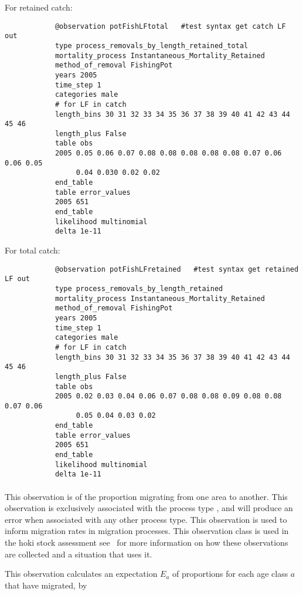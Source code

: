 \begin{itemize}
	For retained catch:
	
	{\small{\begin{verbatim}
			@observation potFishLFtotal   #test syntax get catch LF out
			type process_removals_by_length_retained_total
			mortality_process Instantaneous_Mortality_Retained
			method_of_removal FishingPot
			years 2005
			time_step 1
			categories male
			# for LF in catch
			length_bins 30 31 32 33 34 35 36 37 38 39 40 41 42 43 44 45 46 
			length_plus False
			table obs
			2005 0.05 0.06 0.07 0.08 0.08 0.08 0.08 0.08 0.07 0.06 0.06 0.05 
			     0.04 0.030 0.02 0.02
			end_table
			table error_values
			2005 651
			end_table
			likelihood multinomial
			delta 1e-11
			\end{verbatim}}}
	
	For total catch:
	
	{\small{\begin{verbatim}
			@observation potFishLFretained   #test syntax get retained LF out
			type process_removals_by_length_retained
			mortality_process Instantaneous_Mortality_Retained
			method_of_removal FishingPot
			years 2005
			time_step 1
			categories male
			# for LF in catch
			length_bins 30 31 32 33 34 35 36 37 38 39 40 41 42 43 44 45 46 
			length_plus False
			table obs
			2005 0.02 0.03 0.04 0.06 0.07 0.08 0.08 0.09 0.08 0.08 0.07 0.06 
			     0.05 0.04 0.03 0.02
			end_table
			table error_values
			2005 651
			end_table
			likelihood multinomial
			delta 1e-11
			\end{verbatim}}}
	
	
	\paragraph*{\label{sec:Proportions-migrating}}\label{sec:Observation-ProportionsMigrating}
	
	This observation is of the proportion migrating from one area to another. This observation is exclusively associated with the process type , and will produce an error when associated with any other process type. This observation is used to inform migration rates in migration processes. This observation class is used in the hoki stock assessment see~\cite{francis_03} for more information on how these observations are collected and a situation that uses it.
	
	This observation calculates an expectation $E_a$ of proportions for each age class $a$ that have migrated, by
	

\end{itemize}

